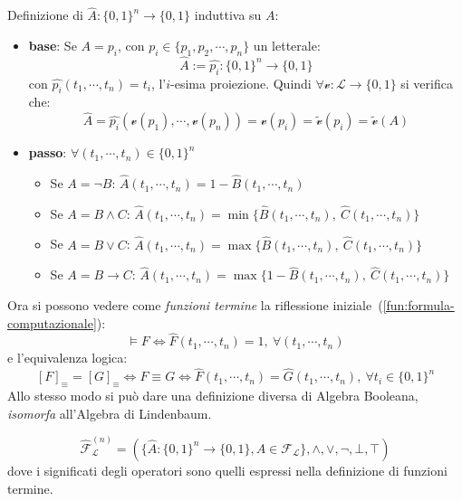 \begin{defi}
Definizione di $\hat A : \{0,1\}^n \rightarrow \{0,1\}$ induttiva su $A$:
\begin{itemize}
  \item \textbf{base}: Se $ A = p_i$, con $p_i \in \{p_1, p_2, \cdots, p_n\}$ un letterale:
  $$\hat A := \hat{p_i} : \{0,1\}^n \rightarrow \{0,1\}$$
  con $\hat{p_i}(t_1, \cdots, t_n) = t_i$, l'$i$-esima proiezione. 
  Quindi $\forall \mathcal{v}: \mathscr{L} \rightarrow \{0,1\}$ si verifica che: 
  $$
  \hat{A} = \hat{p_i}(\mathcal{v}(p_1), \cdots, \mathcal{v}(p_n)) = \mathcal{v}(p_i) = \widetilde{\mathcal{v}}(p_i) = \widetilde{\mathcal{v}}(A)
  $$
\item \textbf{passo}: $\forall (t_1, \cdots, t_n) \in \{0,1\}^n$
  \begin{itemize}
    \item Se $A = \neg B$: $\hat{A}(t_1, \cdots, t_n) =  1 - \hat{B}(t_1, \cdots, t_n)$
    \item Se $A = B \land C$: $\hat{A}(t_1, \cdots, t_n) = \min \{\hat{B}(t_1, \cdots, t_n),\ \hat{C}(t_1, \cdots, t_n)\}$
    \item Se $A = B \lor C$: $\hat{A}(t_1, \cdots, t_n) = \max \{\hat{B}(t_1, \cdots, t_n),\ \hat{C}(t_1, \cdots, t_n)\}$
    \item Se $A = B \rightarrow C$: $\hat{A}(t_1, \cdots, t_n) = \max \{1 - \hat{B}(t_1, \cdots, t_n),\ \hat{C}(t_1, \cdots, t_n)\}$
  \end{itemize}
\end{itemize}
\end{defi}
\noindent
Ora si possono vedere come \textit{funzioni termine} la riflessione iniziale~(\ref{fun:formula-computazionale}): 
$$
\models F \iff \hat{F}(t_1, \cdots, t_n) = 1,\ \forall (t_1, \cdots, t_n)
$$
e l'equivalenza logica: 
$$
[F]_{\equiv} = [G]_{\equiv} \iff F \equiv G \iff \hat{F}(t_1, \cdots, t_n) = \hat{G}(t_1, \cdots, t_n),\ \forall t_i \in \{0,1\}^n
$$
Allo stesso modo si può dare una definizione diversa di Algebra Booleana, \textit{isomorfa} all'Algebra di Lindenbaum.
\begin{defi}
$$
\hat{\mathscr{F}}_\mathscr{L}^{(n)} = (\{\hat{A}: \{0,1\}^n \rightarrow \{0,1\}, A \in \mathscr{F_L}\}, \land, \lor, \neg, \bot, \top) 
$$
dove i significati degli operatori sono quelli espressi nella definizione di funzioni termine. 
\end{defi}

